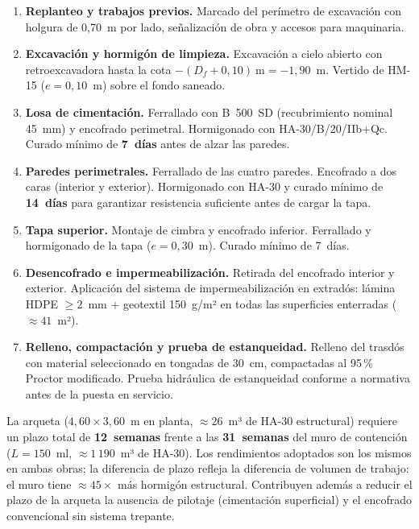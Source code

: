 \begin{enumerate}[label=\textbf{\arabic*.}]
  \item \textbf{Replanteo y trabajos previos.}
    Marcado del perímetro de excavación con holgura de 0,70~m por lado,
    señalización de obra y accesos para maquinaria.
  \item \textbf{Excavación y hormigón de limpieza.}
    Excavación a cielo abierto con retroexcavadora hasta la cota
    $-(D_f + 0{,}10)~\text{m} = -1{,}90$~m.
    Vertido de HM-15 ($e=0{,}10$~m) sobre el fondo saneado.
  \item \textbf{Losa de cimentación.}
    Ferrallado con B~500~SD (recubrimiento nominal 45~mm) y encofrado
    perimetral. Hormigonado con HA-30/B/20/IIb+Qc.
    Curado mínimo de \textbf{7~días} antes de alzar las paredes.
  \item \textbf{Paredes perimetrales.}
    Ferrallado de las cuatro paredes. Encofrado a dos caras (interior
    y exterior). Hormigonado con HA-30 y curado mínimo de
    \textbf{14~días} para garantizar resistencia suficiente antes
    de cargar la tapa.
  \item \textbf{Tapa superior.}
    Montaje de cimbra y encofrado inferior. Ferrallado y hormigonado
    de la tapa ($e=0{,}30$~m). Curado mínimo de 7~días.
  \item \textbf{Desencofrado e impermeabilización.}
    Retirada del encofrado interior y exterior. Aplicación del sistema
    de impermeabilización en extradós: lámina HDPE $\geq 2$~mm
    + geotextil 150~g/m² en todas las superficies enterradas
    ($\approx 41$~m²).
  \item \textbf{Relleno, compactación y prueba de estanqueidad.}
    Relleno del trasdós con material seleccionado en tongadas de
    30~cm, compactadas al 95\,\% Proctor modificado.
    Prueba hidráulica de estanqueidad conforme a normativa
    antes de la puesta en servicio.
\end{enumerate}

\begin{notabox}
  La arqueta ($4{,}60 \times 3{,}60$~m en planta,
  $\approx 26$~m³ de HA-30 estructural)
  requiere un plazo total de \textbf{12~semanas} frente a las
  \textbf{31~semanas} del muro de contención
  ($L = 150$~ml, $\approx 1\,190$~m³ de HA-30).
  Los rendimientos adoptados son los mismos en ambas obras; la
  diferencia de plazo refleja la diferencia de volumen de trabajo:
  el muro tiene $\approx 45\times$ más hormigón estructural.
  Contribuyen además a reducir el plazo de la arqueta la ausencia
  de pilotaje (cimentación superficial) y el encofrado convencional
  sin sistema trepante.
\end{notabox}

